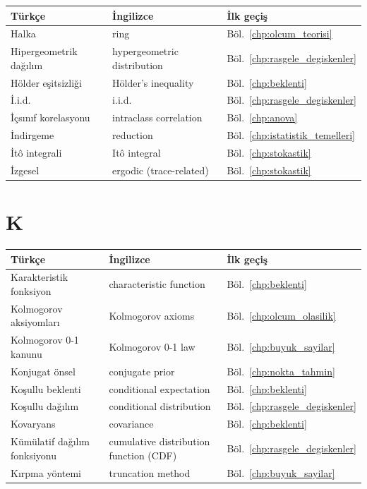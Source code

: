 \begin{tabular}{p{5cm}p{5cm}p{4cm}}
\hline
\textbf{Türkçe} & \textbf{İngilizce} & \textbf{İlk geçiş} \\
\hline
Halka & ring & Böl.~\ref{chp:olcum_teorisi} \\
Hipergeometrik dağılım & hypergeometric distribution & Böl.~\ref{chp:rasgele_degiskenler} \\
Hölder eşitsizliği & Hölder's inequality & Böl.~\ref{chp:beklenti} \\
İ.i.d. & i.i.d. & Böl.~\ref{chp:rasgele_degiskenler} \\
İçsınıf korelasyonu & intraclass correlation & Böl.~\ref{chp:anova} \\
İndirgeme & reduction & Böl.~\ref{chp:istatistik_temelleri} \\
İtô integrali & Itô integral & Böl.~\ref{chp:stokastik} \\
İzgesel & ergodic (trace-related) & Böl.~\ref{chp:stokastik} \\
\hline
\end{tabular}

\section{K}

\begin{tabular}{p{5cm}p{5cm}p{4cm}}
\hline
\textbf{Türkçe} & \textbf{İngilizce} & \textbf{İlk geçiş} \\
\hline
Karakteristik fonksiyon & characteristic function & Böl.~\ref{chp:beklenti} \\
Kolmogorov aksiyomları & Kolmogorov axioms & Böl.~\ref{chp:olcum_olasilik} \\
Kolmogorov 0-1 kanunu & Kolmogorov 0-1 law & Böl.~\ref{chp:buyuk_sayilar} \\
Konjugat önsel & conjugate prior & Böl.~\ref{chp:nokta_tahmin} \\
Koşullu beklenti & conditional expectation & Böl.~\ref{chp:beklenti} \\
Koşullu dağılım & conditional distribution & Böl.~\ref{chp:rasgele_degiskenler} \\
Kovaryans & covariance & Böl.~\ref{chp:beklenti} \\
Kümülatif dağılım fonksiyonu & cumulative distribution function (CDF) & Böl.~\ref{chp:rasgele_degiskenler} \\
Kırpma yöntemi & truncation method & Böl.~\ref{chp:buyuk_sayilar} \\
\hline
\end{tabular}


